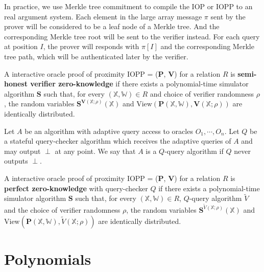 In practice, we use Merkle tree commitment to compile the IOP or IOPP to an real argument system. Each element in the large array message $\pi$ sent by the prover will be considered to be a leaf node of a Merkle tree. And the corresponding Merkle tree root will be sent to the verifier instead. For each query at position $I$, the prover will responds with $\pi[I]$ and the corresponding Merkle tree path, which will be authenticated later by the verifier.

\begin{definition}

A interactive oracle proof of proximity IOPP = ($\textbf{P}$, $\textbf{V}$) for a relation $R$ is \textbf{semi-honest verifier zero-knowledge} if there exists a polynomial-time simulator algorithm $\textbf{S}$ such that, for every $(\mathbb{X}, \mathbb{W}) \in R$ and choice of verifier randomness $\rho$, the random variables $\textbf{S}^{\textbf{V}(\mathbb{X};\rho)}(\mathbb{X})$ and $\text{View}(\textbf{P}(\mathbb{X}, \mathbb{W}), \textbf{V}(\mathbb{X};\rho))$ are identically distributed.
 
\end{definition}

\begin{definition}

Let $A$ be an algorithm with adaptive query access to oracles $O_1, \cdots, O_n$. Let $Q$ be a stateful query-checker algorithm which receives the adaptive queries of $A$ and may output $\perp$ at any point. We say that $A$ is a $Q$-query algorithm if $Q$ never outputs $\perp$.
 
\end{definition}

\begin{definition}

A interactive oracle proof of proximity IOPP = ($\textbf{P}$, $\textbf{V}$) for a relation $R$ is \textbf{perfect zero-knowledge} with query-checker $Q$ if there exists a polynomial-time simulator algorithm $\textbf{S}$ such that, for every $(\mathbb{X}, \mathbb{W}) \in R$, 
$Q$-query algorithm $\widetilde{V}$ and the choice of verifier randomness $\rho$, the random variables $\textbf{S}^{\widetilde{V}(\mathbb{X};\rho)}(\mathbb{X})$ and $\text{View}(\textbf{P}(\mathbb{X}, \mathbb{W}), \widetilde{V}(\mathbb{X};\rho))$ are identically distributed.
 
\end{definition}

\section{Polynomials}

